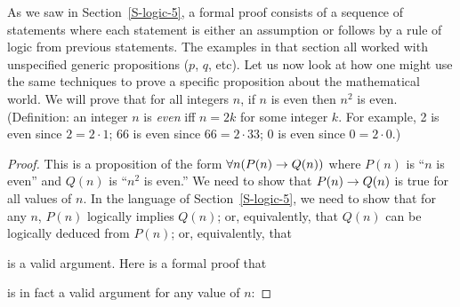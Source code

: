 As we saw in Section~\ref{S-logic-5}, a 
formal proof consists of a sequence of statements where each
statement is either an assumption or follows by a rule of logic
from previous statements. The examples in that section all worked
with unspecified generic propositions ($p$, $q$, etc).  Let us
now look at how one might use the same techniques to prove a
specific proposition about the mathematical world.  We will prove
that for all integers $n$, if $n$ is even then $n^2$ is even.
(Definition: an integer $n$ is {\em even} iff $n=2k$ for some
integer $k$.  For example, 2 is even since $2=2\cdot 1$;
66 is even since $66=2\cdot 33$; 0 is even since $0=2\cdot 0$.)
\begin{proof}
This is a proposition of the form $\forall n (P(n) \rightarrow Q(n))$
where $P(n)$ is ``$n$ is even'' and $Q(n)$ is ``$n^2$ is even.''
We need to show that $P(n) \rightarrow Q(n)$ is true for all values of $n$.
In the language of Section~\ref{S-logic-5}, we need to show that for
any $n$, $P(n)$ logically implies $Q(n)$; or, equivalently, that
$Q(n)$ can be logically deduced from $P(n)$; or, equivalently, that
\begin{center}
\end{center}
is a valid argument.  
Here is a formal proof that
\begin{center}
\end{center}
is in fact a valid argument for any value of $n$:


\end{proof}
